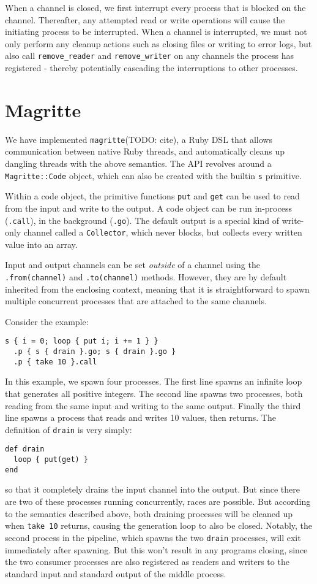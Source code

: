 \documentclass[format=sigconf, review=true, screen=true]{acmart}
\begin{document}
When a channel is closed, we first interrupt every process that is blocked on the channel. Thereafter, any attempted read or write operations will cause the initiating process to be interrupted. When a channel is interrupted, we must not only perform any cleanup actions such as closing files or writing to error logs, but also call \verb/remove_reader/ and \verb/remove_writer/ on any channels the process has registered - thereby potentially cascading the interruptions to other processes.

\section{Magritte}

We have implemented \verb/magritte/(TODO: cite), a Ruby DSL that allows communication between native Ruby threads, and automatically cleans up dangling threads with the above semantics. The API revolves around a \verb/Magritte::Code/ object, which can also be created with the builtin \verb/s/ primitive.

Within a code object, the primitive functions \verb/put/ and \verb/get/ can be used to read from the input and write to the output. A code object can be run in-process (\verb/.call/), in the background (\verb/.go/). The default output is a special kind of write-only channel called a \verb/Collector/, which never blocks, but collects every written value into an array.

Input and output channels can be set \emph{outside} of a channel using the \verb/.from(channel)/ and \verb/.to(channel)/ methods. However, they are by default inherited from the enclosing context, meaning that it is straightforward to spawn multiple concurrent processes that are attached to the same channels.

Consider the example:

\begin{verbatim}
s { i = 0; loop { put i; i += 1 } }
  .p { s { drain }.go; s { drain }.go }
  .p { take 10 }.call
\end{verbatim}
In this example, we spawn four processes. The first line spawns an infinite loop that generates all positive integers. The second line spawns two processes, both reading from the same input and writing to the same output. Finally the third line spawns a process that reads and writes 10 values, then returns. The definition of \verb/drain/ is very simply:

\begin{verbatim}
def drain
  loop { put(get) }
end
\end{verbatim}
so that it completely drains the input channel into the output. But since there are two of these processes running concurrently, races are possible. But according to the semantics described above, both draining processes will be cleaned up when \verb/take 10/ returns, causing the generation loop to also be closed. Notably, the second process in the pipeline, which spawns the two \verb/drain/ processes, will exit immediately after spawning. But this won't result in any programs closing, since the two consumer processes are also registered as readers and writers to the standard input and standard output of the middle process.
\end{document}
